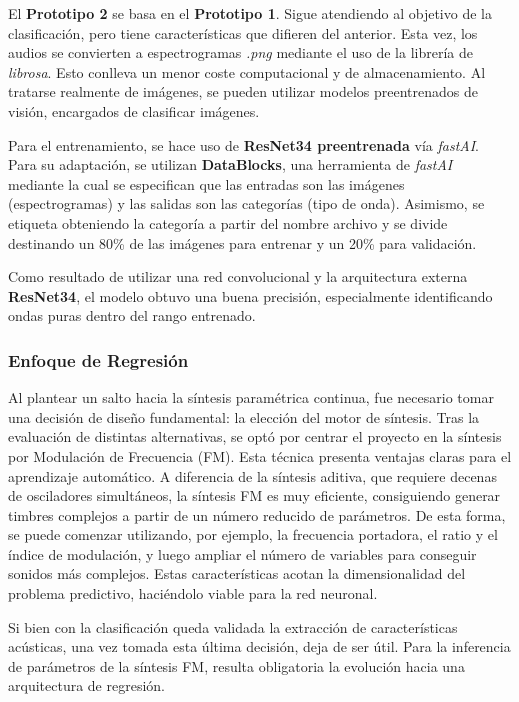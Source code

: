 \documentclass[12pt, a4paper]{article}
\begin{document}
El \textbf{Prototipo 2} se basa en el \textbf{Prototipo 1}. Sigue atendiendo al objetivo de la clasificación, pero tiene 
características que difieren del anterior. Esta vez, los audios se convierten a espectrogramas \textit{.png}
mediante el uso de la librería de \textit{librosa}. Esto conlleva un menor coste computacional y de almacenamiento.
Al tratarse realmente de imágenes, se pueden utilizar modelos preentrenados de visión, encargados de clasificar imágenes.

Para el entrenamiento, se hace uso de \textbf{ResNet34 preentrenada} vía \textit{fastAI}. Para su adaptación, se utilizan \textbf{DataBlocks},
una herramienta de \textit{fastAI} mediante la cual se especifican que las entradas son las imágenes (espectrogramas) y las salidas
son las categorías (tipo de onda). Asimismo, se etiqueta obteniendo la categoría a partir del nombre archivo y se divide
destinando un 80\% de las imágenes para entrenar y un 20\% para validación.

Como resultado de utilizar una red convolucional y la arquitectura externa \textbf{ResNet34}, el modelo obtuvo una buena precisión, especialmente 
identificando ondas puras dentro del rango entrenado. 

\subsubsection{Enfoque de Regresión}
Al plantear un salto hacia la síntesis paramétrica continua, fue necesario tomar una decisión
de diseño fundamental: la elección del motor de síntesis. Tras la evaluación de distintas alternativas, 
se optó por centrar el proyecto en la síntesis por Modulación de Frecuencia (FM). Esta técnica presenta
ventajas claras para el aprendizaje automático. A diferencia de la síntesis aditiva, que requiere decenas
de osciladores simultáneos, la síntesis FM es muy eficiente, consiguiendo generar timbres complejos
a partir de un número reducido de parámetros. De esta forma, se puede comenzar utilizando, por ejemplo, 
la frecuencia portadora, el ratio y el índice de modulación, y luego ampliar el número de variables para
conseguir sonidos más complejos. Estas características acotan la dimensionalidad del problema predictivo, 
haciéndolo viable para la red neuronal.   

Si bien con la clasificación queda validada la extracción de características acústicas, una vez tomada 
esta última decisión, deja de ser útil. Para la inferencia de parámetros de la síntesis FM, resulta 
obligatoria la evolución hacia una arquitectura de regresión.
\end{document}
